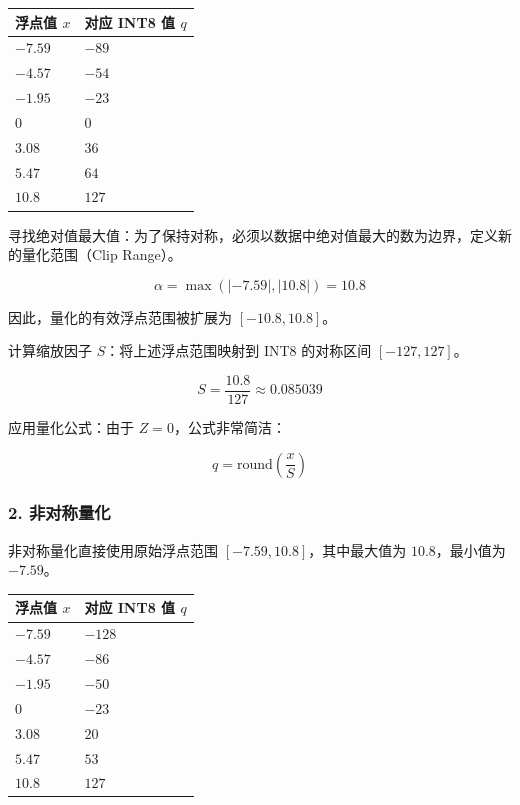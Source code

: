\begin{longtable}[]{@{}
  >{\raggedleft\arraybackslash}p{}
  >{\raggedleft\arraybackslash}p{}@{}}
\toprule
浮点值 \(x\) & 对应 INT8 值 \(q\) \\
\midrule
\endhead
\(-7.59\) & \(-89\) \\
\(-4.57\) & \(-54\) \\
\(-1.95\) & \(-23\) \\
\(0\) & \(0\) \\
\(3.08\) & \(36\) \\
\(5.47\) & \(64\) \\
\(10.8\) & \(127\) \\
\bottomrule
\end{longtable}

寻找绝对值最大值：为了保持对称，必须以数据中绝对值最大的数为边界，定义新的量化范围（Clip Range）。

\[
\alpha = \max(|-7.59|, |10.8|) = 10.8
\]

因此，量化的有效浮点范围被扩展为 \([-10.8, 10.8]\)。

计算缩放因子 \(S\)：将上述浮点范围映射到 INT8 的对称区间 \([-127, 127]\)。

\[
S = \frac{10.8}{127} \approx 0.085039
\]

应用量化公式：由于 \(Z = 0\)，公式非常简洁：

\[
q = \mathrm{round}\left(\frac{x}{S}\right)
\]

\hypertarget{ux975eux5bf9ux79f0ux91cfux5316}{%
\subsubsection{2. 非对称量化}\label{ux975eux5bf9ux79f0ux91cfux5316}}

非对称量化直接使用原始浮点范围 \([-7.59, 10.8]\)，其中最大值为 \(10.8\)，最小值为 \(-7.59\)。

\begin{longtable}[]{@{}
  >{\raggedleft\arraybackslash}p{}
  >{\raggedleft\arraybackslash}p{}@{}}
\toprule
浮点值 \(x\) & 对应 INT8 值 \(q\) \\
\midrule
\endhead
\(-7.59\) & \(-128\) \\
\(-4.57\) & \(-86\) \\
\(-1.95\) & \(-50\) \\
\(0\) & \(-23\) \\
\(3.08\) & \(20\) \\
\(5.47\) & \(53\) \\
\(10.8\) & \(127\) \\
\bottomrule
\end{longtable}

